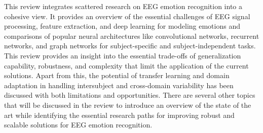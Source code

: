 \documentclass{WileyMSP-template}
\begin{document}
\begin{table}[htb]
\centering
\small
\renewcommand{\arraystretch}{1.1}
\setlength{\tabcolsep}{3pt}
\caption{Comparison of coverage across recent EEG emotion recognition reviews. The proposed review (This Work) provides comprehensive coverage across all major dimensions.}
\label{tab:coverage_comparison_transposed}

\end{table}

This review integrates scattered research on EEG emotion recognition into a cohesive view. It provides an overview of the essential challenges of EEG signal processing, feature extraction, and deep learning for modeling emotions and comparisons of popular neural architectures like convolutional networks, recurrent networks, and graph networks for subject-specific and subject-independent tasks. This review provides an insight into the essential trade-offs of generalization capability, robustness, and complexity that limit the application of the current solutions. Apart from this, the potential of transfer learning and domain adaptation in handling intersubject and cross-domain variability has been discussed with both limitations and opportunities. There are several other topics that will be discussed in the review to introduce an overview of the state of the art while identifying the essential research paths for improving robust and scalable solutions for EEG emotion recognition.
\end{document}
